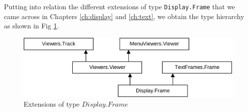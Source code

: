 Putting into relation the different extensions of type \verb|Display.Frame| that we came across
in Chapters \ref{ch:display} and \ref{ch:text}, we obtain the type hierarchy as shown in Fig
\ref{fig:extensions}.
\begin{figure}[h!]
  \label{fig:extensions}
  \centering
  \includegraphics[width=\textwidth]{i/h}
  \caption{Extensions of type $Display.Frame$}
\end{figure}
